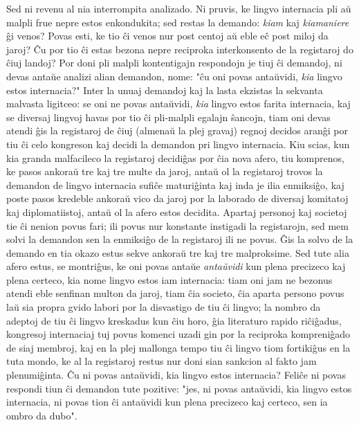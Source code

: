    Sed ni revenu al nia interrompita analizado. Ni pruvis, ke lingvo
internacia pli a\u u malpli frue nepre estos enkondukita; sed restas
la demando: {\sl kiam} kaj {\sl kiamaniere} \^gi venos? Povas esti,
ke tio \^ci venos nur post centoj a\u u eble e\^c post miloj da
jaroj? \^Cu por tio \^ci estas bezona nepre reciproka interkonsento
de la registaroj do \^ciuj landoj? Por doni pli malpli kontentigajn
respondojn je tiuj \^ci demandoj, ni devas anta\u ue analizi alian
demandon, nome: "\^cu oni povas anta\u uvidi, {\sl kia} lingvo
estos internacia?" Inter la unuaj demandoj kaj la lasta ekzistas la
sekvanta malvasta ligitceo: se oni ne povas anta\u uvidi, {\sl kia}
lingvo estos farita internacia, kaj se diversaj lingvoj havas por
tio \^ci pli-malpli egalajn \^sancojn, tiam oni devas atendi \^gis
la registaroj de \^ciuj (almena\u u la plej gravaj) regnoj decidos
aran\^gi por tiu \^ci celo kongreson kaj decidi la demandon pri
lingvo internacia. Kiu scias, kun kia granda malfacileco la
registaroj decidi\^gas por \^cia nova afero, tiu komprenos, ke pasos
ankora\u u tre kaj tre multe da jaroj, anta\u u ol la registaroj
trovos la demandon de lingvo internacia sufi\^ce maturi\^ginta kaj
inda je ilia enmiksi\^go, kaj poste pasos kredeble ankora\u u vico
da jaroj por la laborado de diversaj komitatoj kaj diplomatiistoj,
anta\u u ol la afero estos decidita. Apartaj personoj kaj societoj
tie \^ci nenion povus fari; ili povus nur konstante instigadi la
registarojn, sed mem solvi la demandon sen la enmiksi\^go de la
registaroj ili ne povus. \^Gis la solvo de la demando en tia okazo
estus sekve ankora\u u tre kaj tre malproksime. Sed tute alia afero
estus, se montri\^gus, ke oni povas anta\u ue {\sl anta\u uvidi} kun
plena precizeco kaj plena certeco, kia nome lingvo estos iam
internacia: tiam oni jam ne bezonus atendi eble senfinan multon da
jaroj, tiam \^cia societo, \^cia aparta persono povus la\u u sia
propra gvido labori por la disvastigo de tiu \^ci lingvo; la nombro
da adeptoj de tiu \^ci lingvo kreskadus kun \^ciu horo, \^gia
literaturo rapido ri\^ci\^gadus, kongresoj internaciaj tuj povus
komenci uzadi gin por la reciproka kompreni\^gado de siaj membroj,
kaj en la plej mallonga tempo tiu \^ci lingvo tiom fortiki\^gus en
la tuta mondo, ke al la registaroj restus nur doni sian sankcion al
fakto jam plenumi\^ginta. \^Cu ni povas anta\u uvidi, kia lingvo
estos internacia? Feli\^ce ni povas respondi tiun \^ci demandon tute
pozitive: "jes, ni povas anta\u uvidi, kia lingvo estos internacia,
ni povas tion \^ci anta\u uvidi kun plena precizeco kaj certeco, sen
ia ombro da dubo".

